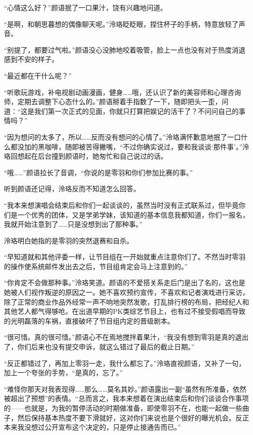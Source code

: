 \documentclass[UTF8, scheme = chinese, openany]{ctexbook}
\begin{document}
“心情这么好？”颜语抿了一口果汁，饶有兴趣地问道。

“是啊，和朝思暮想的偶像聊天呢。”泠珞眨眨眼，捏住杯子的手柄，特意放轻了声音。

“别提了，都要过气啦。”颜语没心没肺地咬着吸管，脸上一点也没有对于热度消退感到不安的样子。

“最近都在干什么呢？”

“听歌玩游戏，补电视剧动画漫画，健身……哦，还认识了新的美容师和心理咨询师，定期去调整下心态什么的。”颜语掰着手指数了一下，随即把头一歪，问道：“这是我们第一次正式的见面，你就只打算把娱记的活干了？不问问自己的事情吗？”

“因为想问的太多了，所以……反而没有想问的心情了。”泠珞满怀歉意地抿了一口什么都没加的黑咖啡，随即被苦得撇嘴，“不过你确实说过，要和我谈谈‘那件事’。”泠珞回想起在后台撞到颜语时，她匆忙和自己说过的话。

“哦……”颜语拉长了音调，“你说的是零羽和你们参加比赛的事。”

听到颜语还记得，泠珞反而不知道怎么回答。

“我本来想演唱会结束后和你们一起谈谈的，虽然当时没有正式联系过，但毕竟你们是一个优秀的团体，又是学弟学妹，该知道的基本信息我都知道，你们一报名，我就开始注意到了……只是没想到出了那种事。”

泠珞明白她指的是零羽的突然退赛和自杀。

“早知道就和其他评委一样，让节目组在一开始就重点注意你们了。不然当时零羽的操作使系统邮件发出去之后，节目组肯定会马上注意到的。”

“你肯定不会做那种事。”泠珞笑道。颜语的不爱搭关系走后门是出了名的，这也是她被人们视作叛逆的原因之一。她不喜欢预约宣传，不喜欢和记者演戏进行采访，除了正常的商业作品外经常一声不响地突然发歌，打乱排行榜的布局，把经纪人和其他艺人都气得够呛。在出道早期的PK类综艺节目上，也有过不接受假唱而导致的光明磊落的车祸，直接破坏了节目组内定的晋级剧本。

“很可惜。真的很可惜。”颜语心不在焉地搅拌着果汁，“我没有想到零羽是真的退出了，你们后来也没有提交申诉，就这么错过了最后的截止日期。”

“反正都错过了，再加上零羽一走，我什么都忘了。”泠珞直视颜语，又补了一句，加上一个夸张的手势，“是真的，忘了。”

“难怪你那天对我表现得……那么……莫名其妙。”颜语露出一副“虽然有所准备，依然被超出了预想”的表情。“总而言之，我本来想着在演出结束后和你们谈谈合作事项的——也就是，为我的暂停活动的时期做准备，即使零羽不在，也能一起做一些曲子，然后保持基本热度不要下滑就好，这对你们来说也是个很好的曝光机会。反正本来我没想过公开宣布这个决定的，只是停止接通告而已。”
\end{document}
